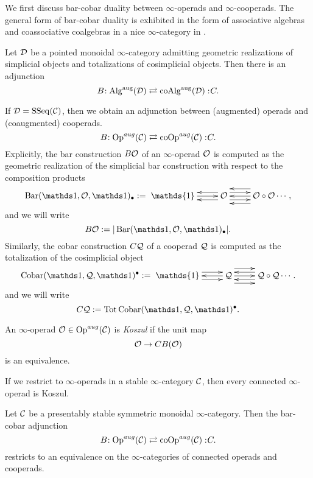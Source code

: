 We first discuss bar-cobar duality between $\infty$-operads and $\infty$-cooperads. The general form of bar-cobar duality is exhibited in the form of associative algebras and coassociative coalgebras in a nice $\infty$-category in \cite{HA}.
\begin{proposition}
\cite[Remark 5.2.2.19.]{HA}
Let ${\mathcal{D}}$ be a pointed monoidal $\infty$-category admitting geometric realizations of simplicial objects and totalizations of cosimplicial objects. Then there is an adjunction
\[
B\negmedspace: \operatorname{Alg}^{\operatorname{aug}} ({\mathcal{D}})\rightleftarrows \operatorname{coAlg}^{\operatorname{aug}}({\mathcal{D}}):\negmedspace C.
\]
\end{proposition}
If ${\mathcal{D}}= \operatorname{SSeq}({\mathcal{C}})$, then we obtain an adjunction between (augmented) operads and (coaugmented) cooperads.
	$$
	B\negmedspace: \operatorname{Op}^{aug}({\mathcal{C}})\rightleftarrows \operatorname{coOp}^{aug}({\mathcal{C}}):\negmedspace C.
	$$
Explicitly, the bar construction $B{\mathcal{O}}$ of an $\infty$-operad ${\mathcal{O}}$ is computed as the geometric realization of the simplicial bar construction with respect to the composition products \cite[Section 4.4.2]{HA}
	\[
		\Barconstruction(\triv, \CO, \triv)_{\bullet}:=\xymatrix{ \mathds{1}\ar@<0ex>[r]  &  
		\CO \ar@<1ex>[r] \ar@<-1ex>[r] \ar@<1ex>[l] \ar@<-1ex>[l]  &  \CO\circ \CO \ar@<2ex>[l] \ar@<0ex>[l] \ar@<-2ex>[l] \cdots},
\]
and we will write 
$$
B\CO := |\Barconstruction(\triv, \CO, \triv)_{\bullet}|.
$$
	Similarly, the cobar construction $C{\mathcal{Q}}$ of a cooperad ${\mathcal{Q}}$ is computed as the totalization of the cosimplicial object
	\[
		\Cobar(\triv, \CQ, \triv)^{\bullet}:=\xymatrix{ \mathds{1} \ar@<1ex>[r] \ar@<-1ex>[r] &  
		\CQ \ar@<0ex>[l] \ar@<2ex>[r] \ar@<0ex>[r] \ar@<-2ex>[r] & \CQ\circ \CQ \ar@<1ex>[l] \ar@<-1ex>[l] \cdots}.
\]
and we will write 
$$
C\CQ := \Tot \Cobar(\triv, \CQ, \triv)^{\bullet}.
$$



\begin{definition}
	An $\infty$-operad ${\mathcal{O}}\in \operatorname{Op}^{aug}({\mathcal{C}})$ is \emph{Koszul} if the unit map
	$$
	{\mathcal{O}}\rightarrow CB({\mathcal{O}})
	$$
	is an equivalence.
\end{definition}

If we restrict to $\infty$-operads in a stable $\infty$-category ${\mathcal{C}}$, then every connected $\infty$-operad is Koszul.

\begin{proposition}
\cite[Proposition 3.4]{Heuts_Koszul}
\label{Connected operads are Koszul}
Let ${\mathcal{C}}$ be a presentably stable symmetric monoidal $\infty$-category. Then the bar-cobar adjunction
	$$
	B\negmedspace: \operatorname{Op}^{aug}({\mathcal{C}})\rightleftarrows \operatorname{coOp}^{aug}({\mathcal{C}}):\negmedspace C.
	$$
	restricts to an equivalence on the  $\infty$-categories of connected operads and cooperads.
\end{proposition}


